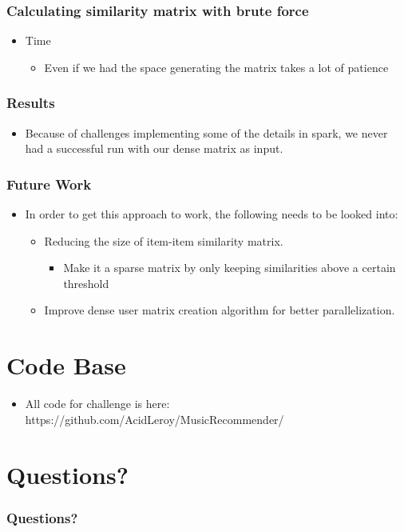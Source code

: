 \documentclass[11pt]{beamer}
\begin{document}
  \begin{frame}
    \frametitle{Calculating similarity matrix with brute force}
    \begin{itemize}
      \item Time
        \begin{itemize}
          \item Even if we had the space generating the matrix takes a lot of patience
        \end{itemize}
    \end{itemize}
  \end{frame}

  \begin{frame}
    \frametitle{Results}
    \begin{itemize}
      \item Because of challenges implementing some of the details in spark, we never had a successful run
      with our dense matrix as input.
    \end{itemize}
  \end{frame}

  \begin{frame}
    \frametitle{Future Work}
    \begin{itemize}
      \item In order to get this approach to work, the following needs to be looked into:
      \begin{itemize}
        \item Reducing the size of item-item similarity matrix.
        \begin{itemize}
          \item Make it a sparse matrix by only keeping similarities above a certain threshold
        \end{itemize}
        \item Improve dense user matrix creation algorithm for better parallelization.
      \end{itemize}
    \end{itemize}
  \end{frame}

  \section{Code Base}
  \begin{frame}
    \begin{itemize}
      \item All code for challenge is here: https://github.com/AcidLeroy/MusicRecommender/
    \end{itemize}
  \end{frame}

  \section{Questions?}
  \begin{frame}
    \frametitle{Questions?}
  \end{frame}

  
\end{document}
